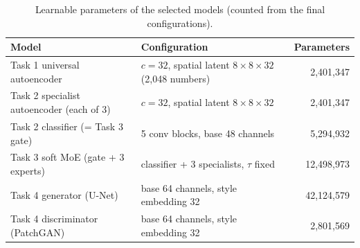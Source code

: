 \begin{table}[t]
\centering
\caption{Learnable parameters of the selected models (counted from the final configurations).}
\label{tab:params}
\footnotesize
\begin{tabular}{p{3.0cm}p{3.6cm}r}
\toprule
Model & Configuration & Parameters \\
\midrule
Task 1 universal autoencoder & $c=32$, spatial latent $8{\times}8{\times}32$ (2{,}048 numbers) & 2{,}401{,}347 \\
Task 2 specialist autoencoder (each of 3) & $c=32$, spatial latent $8{\times}8{\times}32$ & 2{,}401{,}347 \\
Task 2 classifier (= Task 3 gate) & 5 conv blocks, base 48 channels & 5{,}294{,}932 \\
Task 3 soft MoE (gate + 3 experts) & classifier + 3 specialists, $\tau$ fixed & 12{,}498{,}973 \\
Task 4 generator (U-Net) & base 64 channels, style embedding 32 & 42{,}124{,}579 \\
Task 4 discriminator (PatchGAN) & base 64 channels, style embedding 32 & 2{,}801{,}569 \\
\bottomrule
\end{tabular}
\end{table}
